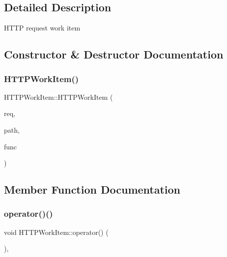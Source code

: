 \subsection{Detailed Description}
H\+T\+TP request work item 

\subsection{Constructor \& Destructor Documentation}
\mbox{\label{class_h_t_t_p_work_item_adca1a11f0b3a58bd59a1671bd72fb3d0}} 
\subsubsection{\texorpdfstring{H\+T\+T\+P\+Work\+Item()}{HTTPWorkItem()}}
{\footnotesize\ttfamily H\+T\+T\+P\+Work\+Item\+::\+H\+T\+T\+P\+Work\+Item (\begin{DoxyParamCaption}\item[{\mbox{\hyperlink{class_h_t_t_p_request}{H\+T\+T\+P\+Request}} $\ast$}]{req,  }\item[{const std\+::string \&}]{path,  }\item[{const \mbox{\hyperlink{httpserver_8h_a90b0a9a188f591e83851dad2b701088f}{H\+T\+T\+P\+Request\+Handler}} \&}]{func }\end{DoxyParamCaption})\hspace{0.3cm}{\ttfamily [inline]}}



\subsection{Member Function Documentation}
\mbox{\label{class_h_t_t_p_work_item_a85addf7a6b8fdbf0a63becc7e1f0135e}} 
\subsubsection{\texorpdfstring{operator()()}{operator()()}}
{\footnotesize\ttfamily void H\+T\+T\+P\+Work\+Item\+::operator() (\begin{DoxyParamCaption}{ }\end{DoxyParamCaption})\hspace{0.3cm}{\ttfamily [inline]}, {\ttfamily [virtual]}}



